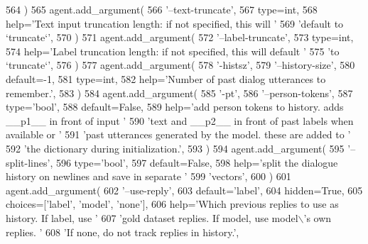 \begin{DoxyCode}
564         )
565         agent.add\_argument(
566             \textcolor{stringliteral}{'--text-truncate'},
567             type=int,
568             help=\textcolor{stringliteral}{'Text input truncation length: if not specified, this will '}
569             \textcolor{stringliteral}{'default to `truncate`'},
570         )
571         agent.add\_argument(
572             \textcolor{stringliteral}{'--label-truncate'},
573             type=int,
574             help=\textcolor{stringliteral}{'Label truncation length: if not specified, this will default '}
575             \textcolor{stringliteral}{'to `truncate`'},
576         )
577         agent.add\_argument(
578             \textcolor{stringliteral}{'-histsz'},
579             \textcolor{stringliteral}{'--history-size'},
580             default=-1,
581             type=int,
582             help=\textcolor{stringliteral}{'Number of past dialog utterances to remember.'},
583         )
584         agent.add\_argument(
585             \textcolor{stringliteral}{'-pt'},
586             \textcolor{stringliteral}{'--person-tokens'},
587             type=\textcolor{stringliteral}{'bool'},
588             default=\textcolor{keyword}{False},
589             help=\textcolor{stringliteral}{'add person tokens to history. adds \_\_p1\_\_ in front of input '}
590             \textcolor{stringliteral}{'text and \_\_p2\_\_ in front of past labels when available or '}
591             \textcolor{stringliteral}{'past utterances generated by the model. these are added to '}
592             \textcolor{stringliteral}{'the dictionary during initialization.'},
593         )
594         agent.add\_argument(
595             \textcolor{stringliteral}{'--split-lines'},
596             type=\textcolor{stringliteral}{'bool'},
597             default=\textcolor{keyword}{False},
598             help=\textcolor{stringliteral}{'split the dialogue history on newlines and save in separate '}
599             \textcolor{stringliteral}{'vectors'},
600         )
601         agent.add\_argument(
602             \textcolor{stringliteral}{'--use-reply'},
603             default=\textcolor{stringliteral}{'label'},
604             hidden=\textcolor{keyword}{True},
605             choices=[\textcolor{stringliteral}{'label'}, \textcolor{stringliteral}{'model'}, \textcolor{stringliteral}{'none'}],
606             help=\textcolor{stringliteral}{'Which previous replies to use as history. If label, use '}
607             \textcolor{stringliteral}{'gold dataset replies. If model, use model\(\backslash\)'s own replies. '}
608             \textcolor{stringliteral}{'If none, do not track replies in history.'},

\end{DoxyCode}
